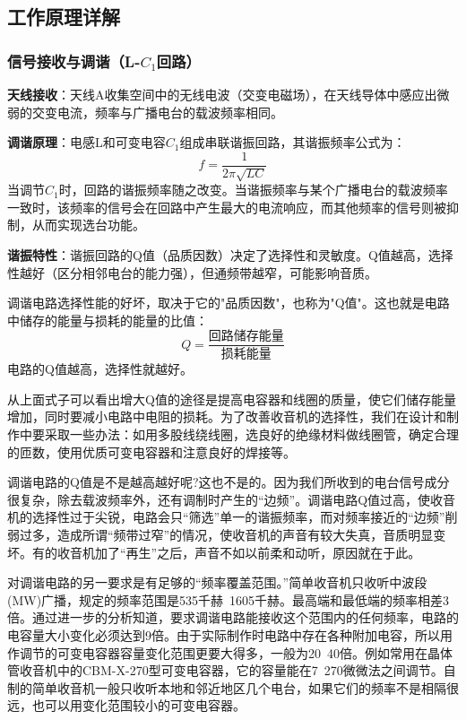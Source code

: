 \documentclass[12pt,UTF8]{ctexbook}
\begin{document}
\subsection{工作原理详解}

\subsubsection{信号接收与调谐（L-$C_1$回路）}

\textbf{天线接收}：天线A收集空间中的无线电波（交变电磁场），在天线导体中感应出微弱的交变电流，频率与广播电台的载波频率相同。

\textbf{调谐原理}：电感L和可变电容$C_1$组成串联谐振回路，其谐振频率公式为：
\[ f = \frac{1}{2\pi\sqrt{LC}} \]
当调节$C_1$时，回路的谐振频率随之改变。当谐振频率与某个广播电台的载波频率一致时，该频率的信号会在回路中产生最大的电流响应，而其他频率的信号则被抑制，从而实现选台功能。

\textbf{谐振特性}：谐振回路的Q值（品质因数）决定了选择性和灵敏度。Q值越高，选择性越好（区分相邻电台的能力强），但通频带越窄，可能影响音质。

调谐电路选择性能的好坏，取决于它的"品质因数"，也称为"Q值"。这也就是电路中储存的能量与损耗的能量的比值：
\[ Q = \frac{\text{回路储存能量}}{\text{损耗能量}} \]
电路的Q值越高，选择性就越好。

从上面式子可以看出增大Q值的途径是提高电容器和线圈的质量，使它们储存能量增加，同时要减小电路中电阻的损耗。为了改善收音机的选择性，我们在设计和制作中要采取一些办法：如用多股线绕线圈，选良好的绝缘材料做线圈管，确定合理的匝数，使用优质可变电容器和注意良好的焊接等。

调谐电路的Q值是不是越高越好呢?这也不是的。因为我们所收到的电台信号成分很复杂，除去载波频率外，还有调制时产生的“边频”。调谐电路Q值过高，使收音机的选择性过于尖锐，电路会只“筛选”单一的谐振频率，而对频率接近的“边频”削弱过多，造成所谓“频带过窄”的情况，使收音机的声音有较大失真，音质明显变坏。有的收音机加了“再生”之后，声音不如以前柔和动听，原因就在于此。

对调谐电路的另一要求是有足够的“频率覆盖范围。”简单收音机只收听中波段(MW)广播，规定的频率范围是535千赫~1605千赫。最高端和最低端的频率相差3倍。通过进一步的分析知道，要求调谐电路能接收这个范围内的任何频率，电路的电容量大小变化必须达到9倍。由于实际制作时电路中存在各种附加电容，所以用作调节的可变电容器容量变化范围更要大得多，一般为20~40倍。例如常用在晶体管收音机中的CBM-X-270型可变电容器，它的容量能在7~270微微法之间调节。自制的简单收音机一般只收听本地和邻近地区几个电台，如果它们的频率不是相隔很远，也可以用变化范围较小的可变电容器。
\end{document}
